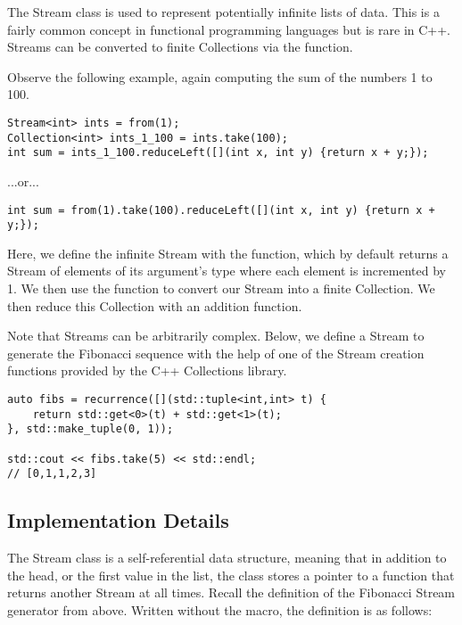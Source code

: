 
The Stream class is used to represent potentially infinite lists of data.
This is a fairly common concept in functional programming languages but is rare in C++.
Streams can be converted to finite Collections via the  function.

Observe the following example, again computing the sum of the numbers 1 to 100.

\begin{lstlisting}
Stream<int> ints = from(1);
Collection<int> ints_1_100 = ints.take(100);
int sum = ints_1_100.reduceLeft([](int x, int y) {return x + y;});
\end{lstlisting}

...or...

\begin{lstlisting}
int sum = from(1).take(100).reduceLeft([](int x, int y) {return x + y;});
\end{lstlisting}

Here, we define the infinite Stream with the  function, which by default returns a Stream of elements of its argument's type where each element is incremented by 1.
We then use the  function to convert our Stream into a finite Collection.
We then reduce this Collection with an addition function.

Note that Streams can be arbitrarily complex.
Below, we define a Stream to generate the Fibonacci sequence with the help of one of the Stream creation functions provided by the C++ Collections library.


\begin{lstlisting}
auto fibs = recurrence([](std::tuple<int,int> t) {
    return std::get<0>(t) + std::get<1>(t);
}, std::make_tuple(0, 1));

std::cout << fibs.take(5) << std::endl;
// [0,1,1,2,3]
\end{lstlisting}





\subsection{Implementation Details}

The Stream class is a self-referential data structure, meaning that in addition to the head, or the first value in the list, the class stores a pointer to a function that returns another Stream at all times.
Recall the definition of the Fibonacci Stream generator from above.
Written without the macro, the definition is as follows:

